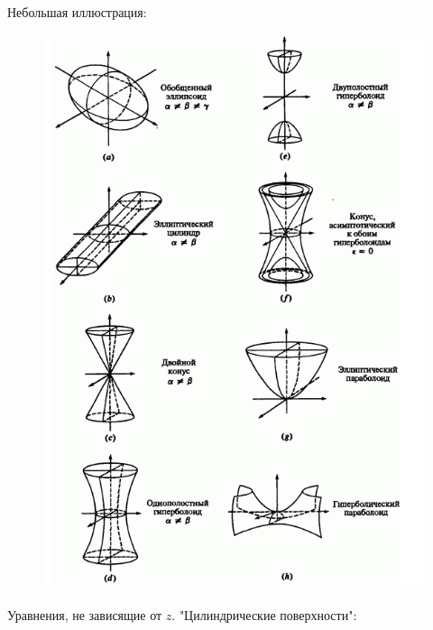 \documentclass[a4paper]{article}
\begin{document}
\begin{colloq}
        Небольшая иллюстрация:
        \begin{figure}[H]
            \centering
            \includegraphics{examples}
        \end{figure}
        
        Уравнения, не зависящие от $z$. "Цилиндрические поверхности":
        

\end{colloq}
\end{document}
